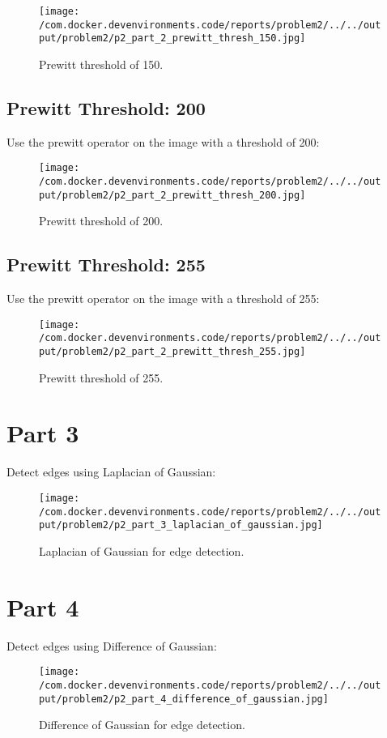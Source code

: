 \documentclass{article}%
\begin{document}
\begin{figure}[h!]%
\centering%
\texttt{[image: /com.docker.devenvironments.code/reports/problem2/../../output/problem2/p2\_part\_2\_prewitt\_thresh\_150.jpg]}%
\caption{Prewitt threshold of 150.}%
\end{figure}

%
\subsection{Prewitt Threshold: 200}%
\label{subsec:PrewittThreshold200}%
Use the prewitt operator on the image with a threshold of 200:%


\begin{figure}[h!]%
\centering%
\texttt{[image: /com.docker.devenvironments.code/reports/problem2/../../output/problem2/p2\_part\_2\_prewitt\_thresh\_200.jpg]}%
\caption{Prewitt threshold of 200.}%
\end{figure}

%
\subsection{Prewitt Threshold: 255}%
\label{subsec:PrewittThreshold255}%
Use the prewitt operator on the image with a threshold of 255:%


\begin{figure}[h!]%
\centering%
\texttt{[image: /com.docker.devenvironments.code/reports/problem2/../../output/problem2/p2\_part\_2\_prewitt\_thresh\_255.jpg]}%
\caption{Prewitt threshold of 255.}%
\end{figure}

%
\newpage

%
\section{Part 3}%
\label{sec:Part3}%
Detect edges using Laplacian of Gaussian:%


\begin{figure}[h!]%
\centering%
\texttt{[image: /com.docker.devenvironments.code/reports/problem2/../../output/problem2/p2\_part\_3\_laplacian\_of\_gaussian.jpg]}%
\caption{Laplacian of Gaussian for edge detection.}%
\end{figure}

%
\section{Part 4}%
\label{sec:Part4}%
Detect edges using Difference of Gaussian:%


\begin{figure}[h!]%
\centering%
\texttt{[image: /com.docker.devenvironments.code/reports/problem2/../../output/problem2/p2\_part\_4\_difference\_of\_gaussian.jpg]}%
\caption{Difference of Gaussian for edge detection.}%
\end{figure}

%
\end{document}
